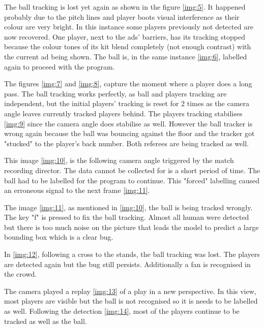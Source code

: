 \documentclass[
    11pt,
    twoside
]{report}
\begin{document}
The ball tracking is lost yet again as shown in the figure \ref{img:5}. It happened probably due to the pitch lines and player boots visual interference as their colour are very bright. In this instance some players previously not detected are now recovered. One player, next to the ads' barriers, has its tracking stopped because the colour tones of its kit blend completely (not enough contrast) with the current ad being shown. The ball is, in the same instance \ref{img:6}, labelled again to proceed with the program.



The figures \ref{img:7} and \ref{img:8}, capture the moment where a player does a long pass. The ball tracking works perfectly, as ball and players tracking are independent, but the initial players' tracking is reset for 2 times as the camera angle leaves currently tracked players behind.
The players tracking stabilises \ref{img:9} since the camera angle does stabilise as well. However the ball tracker is wrong again because the ball was bouncing against the floor and the tracker got "stucked" to the player's back number. Both referees are being tracked as well.



This image \ref{img:10}, is the following camera angle triggered by the match recording director. The data cannot be collected for is a short period of time. The ball had to be labelled for the program to continue. This "forced" labelling caused an erroneous signal to the next frame \ref{img:11}.



The image \ref{img:11}, as mentioned in \ref{img:10}, the ball is being tracked wrongly. The key "f" is pressed to fix the ball tracking. Almost all human were detected but there is too much noise on the picture that leads the model to predict a large bounding box which is a clear bug.


In \ref{img:12}, following a cross to the stands, the ball tracking was lost. The players are detected again but the bug still persists. Additionally a fan is recognised in the crowd.



The camera played a replay \ref{img:13} of a play in a new perspective. In this view, most players are visible but the ball is not recognised so it is needs to be labelled as well. Following the detection \ref{img:14}, most of the players continue to be tracked as well as the ball.
\end{document}
